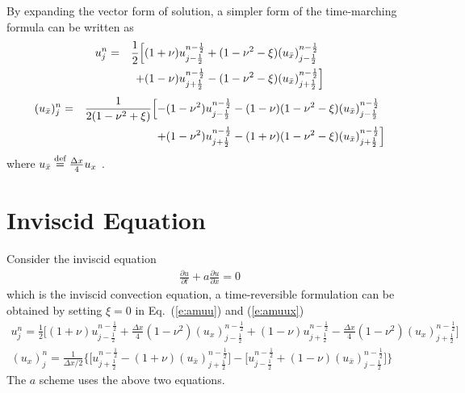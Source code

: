 \documentclass{turgon}
\begin{document}
By expanding the vector form of solution, a simpler form of the time-marching
formula can be written as
\begin{alignat}{2}
  u_j^n &= &\frac{1}{2}\Big[
    &(1+\nu)u_{j-\frac{1}{2}}^{n-\frac{1}{2}}
    + (1-\nu^2-\xi)(u_{\bar{x}})_{j-\frac{1}{2}}^{n-\frac{1}{2}}
    \notag \\
  &&+ &(1-\nu)u_{j+\frac{1}{2}}^{n-\frac{1}{2}}
    - (1-\nu^2-\xi)(u_{\bar{x}})_{j+\frac{1}{2}}^{n-\frac{1}{2}}
           \Big] \label{e:amuu}
\end{alignat}
\begin{alignat}{2}
  (u_{\bar{x}})_j^n &= &\frac{1}{2(1-\nu^2+\xi)}\Big[
    -& (1-\nu^2)u_{j-\frac{1}{2}}^{n-\frac{1}{2}}
    -  (1-\nu)(1-\nu^2-\xi)(u_{\bar{x}})_{j-\frac{1}{2}}^{n-\frac{1}{2}}
    \notag \\
  &&+& (1-\nu^2)u_{j+\frac{1}{2}}^{n-\frac{1}{2}}
    -  (1+\nu)(1-\nu^2-\xi)(u_{\bar{x}})_{j+\frac{1}{2}}^{n-\frac{1}{2}}
                       \Big] \label{e:amuux}
\end{alignat}
where $u_{\bar{x}} \defeq \frac{\Delta x}{4}u_x$ \citep[$a$-$\mu$
scheme]{chang_method_1995}.

\section{Inviscid Equation}
\label{s:inviscid_model}

Consider the inviscid equation
\begin{align}
  \frac{\partial u}{\partial t} + a\frac{\partial u}{\partial x} = 0
  \label{e:conv_govern}
\end{align}
which is the inviscid convection equation, a time-reversible formulation can be
obtained by setting $\xi=0$ in Eq.~(\ref{e:amuu}) and (\ref{e:amuux})
\begin{gather}
  u_j^n = \frac{1}{2}\Big[
      (1+\nu)u_{j-\frac{1}{2}}^{n-\frac{1}{2}}
    + \frac{\Delta x}{4}(1-\nu^2)(u_x)_{j-\frac{1}{2}}^{n-\frac{1}{2}}
    + (1-\nu)u_{j+\frac{1}{2}}^{n-\frac{1}{2}}
    - \frac{\Delta x}{4}(1-\nu^2)(u_x)_{j+\frac{1}{2}}^{n-\frac{1}{2}}
  \Big] \label{e:au} \\
  (u_x)_j^n = \frac{1}{\Delta x/2}\Big\{
      \Big[ u_{j+\frac{1}{2}}^{n-\frac{1}{2}}
         - (1+\nu)(u_{\bar{x}})_{j+\frac{1}{2}}^{n-\frac{1}{2}} \Big]
    - \Big[ u_{j-\frac{1}{2}}^{n-\frac{1}{2}}
         + (1-\nu)(u_{\bar{x}})_{j-\frac{1}{2}}^{n-\frac{1}{2}} \Big]
  \Big\} \label{e:aux}
\end{gather}
The $a$ scheme uses the above two equations.
\end{document}
